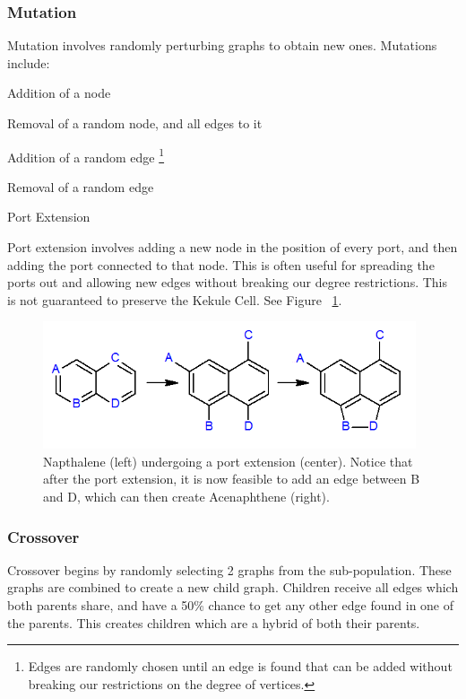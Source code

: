 \documentclass[12pt]{article}
\begin{document}
\subsubsection{Mutation}

Mutation involves randomly perturbing graphs to obtain new ones. Mutations include:
\begin{enumerate*}
\item Addition of a node
\item Removal of a random node, and all edges to it
\item Addition of a random edge \footnote{ Edges are randomly chosen until an edge is found that can be added without breaking our restrictions on the degree of vertices.}
\item Removal of a random edge
\item Port Extension
\end{enumerate*}

Port extension involves adding a new node in the position of every port, and then adding the port connected to that node. This is often useful for spreading the ports out and allowing new edges without breaking our degree restrictions. This is not guaranteed to preserve the Kekule Cell. See Figure ~\ref{fig:portExtension}.

\begin{figure}[ht!]
\centering
\includegraphics[width=110mm]{portExtension.png}
\caption{Napthalene (left) undergoing a port extension (center). Notice that after the port extension, it is now feasible to add an edge between B and D, which can then create Acenaphthene (right).}
\label{fig:portExtension}
\end{figure}

\subsubsection{Crossover}

Crossover begins by randomly selecting 2 graphs from the sub-population. These graphs are combined to create a new child graph. Children receive all edges which both parents share, and have a 50\% chance to get any other edge found in one of the parents. This creates children which are a hybrid of both their parents.
\end{document}
